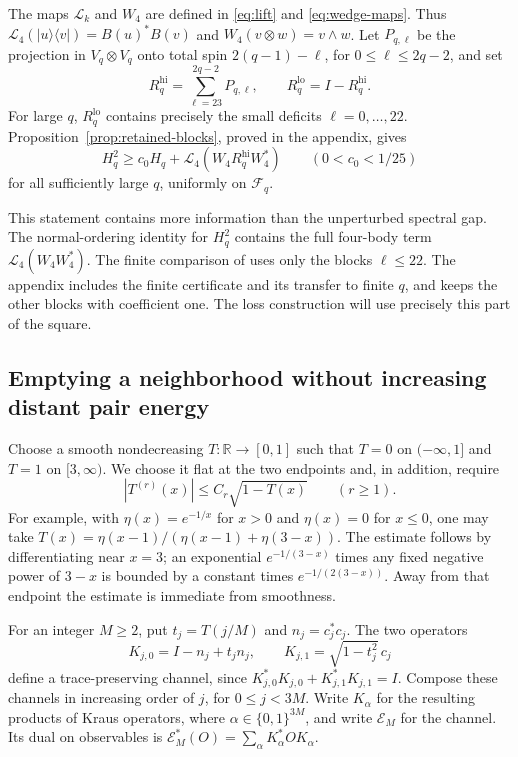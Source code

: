 The maps $\mathcal L_k$ and $W_4$ are defined in
\eqref{eq:lift} and \eqref{eq:wedge-maps}.  Thus
$\mathcal L_4(|u\rangle\langle v|)=B(u)^*B(v)$ and
$W_4(v\otimes w)=v\wedge w$.
Let $P_{q,\ell}$ be the projection in $V_q\otimes V_q$ onto total spin
$2(q-1)-\ell$, for $0\le\ell\le2q-2$, and set
\begin{equation}\label{eq:high-pair-blocks}
 R_q^{\mathrm{hi}}=\sum_{\ell=23}^{2q-2}P_{q,\ell},
 \qquad R_q^{\mathrm{lo}}=I-R_q^{\mathrm{hi}}.
\end{equation}
For large $q$, $R_q^{\mathrm{lo}}$ contains precisely the small deficits
$\ell=0,\ldots,22$.
Proposition~\ref{prop:retained-blocks}, proved in the appendix, gives
\begin{equation}\label{eq:retained-energy}
 H_q^2\ge c_0H_q+
 \mathcal L_4(W_4R_q^{\mathrm{hi}}W_4^*)
 \qquad(0<c_0<1/25)
\end{equation}
for all sufficiently large $q$, uniformly on $\mathcal F_q$.

This statement contains more information than the unperturbed spectral
gap.  The normal-ordering identity for $H_q^2$ contains the full four-body
term $\mathcal L_4(W_4W_4^*)$.  The finite comparison of
\cite[Sections 2--6]{Gap} uses only the blocks $\ell\le22$.
The appendix includes the finite certificate and its transfer to finite
$q$, and keeps the other blocks with coefficient one.  The loss construction will use precisely this
part of the square.

\subsection{Emptying a neighborhood without increasing distant pair energy}

Choose a smooth nondecreasing $T:\mathbb R\to[0,1]$ such that $T=0$ on
$(-\infty,1]$ and $T=1$ on $[3,\infty)$.  We choose it flat at the two
endpoints and, in addition, require
\begin{equation}\label{eq:evacuation-cutoff}
 |T^{(r)}(x)|\le C_r\sqrt{1-T(x)}\qquad(r\ge1).
\end{equation}
For example, with $\eta(x)=e^{-1/x}$ for $x>0$ and $\eta(x)=0$ for $x\le0$,
one may take
$T(x)=\eta(x-1)/(\eta(x-1)+\eta(3-x))$.
The estimate follows by differentiating near $x=3$; an exponential
$e^{-1/(3-x)}$ times any fixed negative power of $3-x$ is bounded by a
constant times $e^{-1/(2(3-x))}$.  Away from that endpoint the estimate is
immediate from smoothness.

For an integer $M\ge2$, put $t_j=T(j/M)$ and $n_j=c_j^*c_j$.  The two
operators
\begin{equation}\label{eq:single-mode-loss}
 K_{j,0}=I-n_j+t_jn_j,
 \qquad K_{j,1}=\sqrt{1-t_j^2}\,c_j
\end{equation}
define a trace-preserving channel, since
$K_{j,0}^*K_{j,0}+K_{j,1}^*K_{j,1}=I$.
Compose these channels in increasing order of $j$, for $0\le j<3M$.
Write $K_\alpha$ for the resulting products of Kraus operators, where
$\alpha\in\{0,1\}^{3M}$, and write $\mathcal E_M$ for the channel.
Its dual on observables is
$\mathcal E_M^*(O)=\sum_\alpha K_\alpha^*OK_\alpha$.

